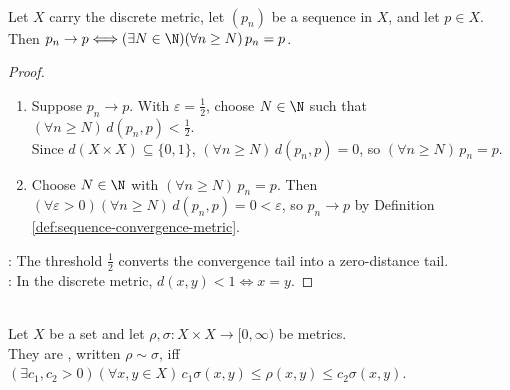 \begin{proposition} \label{prop:discrete-metric-convergence-eventually-constant} \\
Let $X$ carry the discrete metric, let $(p_n)$ be a sequence in $X$, and let $p\in X$. Then $p_n\to p\Longleftrightarrow(\exists N\in\N)(\forall n\geq N)\,p_n=p$.
\begin{proof}
\begin{enumerate}[label=\roman*.]
\setlength{\itemsep}{0pt}
\item[$(\Rightarrow)$] Suppose $p_n\to p$. With $\varepsilon=\frac{1}{2}$, choose $N\in\N$ such that $(\forall n\geq N)\,d(p_n,p)<\frac{1}{2}$.\\
Since $d(X\times X)\subseteq\{0,1\}$, $(\forall n\geq N)\,d(p_n,p)=0$, so $(\forall n\geq N)\,p_n=p$.
\item[$(\Leftarrow)$] Choose $N\in\N$ with $(\forall n\geq N)\,p_n=p$. Then $(\forall\varepsilon>0)(\forall n\geq N)\,d(p_n,p)=0<\varepsilon$, so $p_n\to p$ by Definition \ref{def:sequence-convergence-metric}.
\end{enumerate}
: The threshold $\frac{1}{2}$ converts the convergence tail into a zero-distance tail.\\
: In the discrete metric, $d(x,y)<1\Longleftrightarrow x=y$.
\end{proof}
\end{proposition}

\begin{definition} \label{def:equivalent-metrics} \\
Let $X$ be a set and let $\rho,\sigma:X\times X\to[0,\infty)$ be metrics.\\
They are , written $\rho\sim\sigma$, iff $(\exists c_1,c_2>0)(\forall x,y\in X)\,c_1\sigma(x,y)\leq\rho(x,y)\leq c_2\sigma(x,y)$.
\end{definition}

